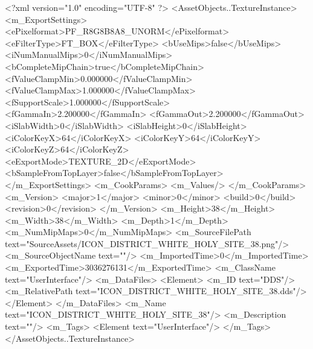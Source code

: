 <?xml version="1.0" encoding="UTF-8" ?>
<AssetObjects..TextureInstance>
	<m_ExportSettings>
		<ePixelformat>PF_R8G8B8A8_UNORM</ePixelformat>
		<eFilterType>FT_BOX</eFilterType>
		<bUseMips>false</bUseMips>
		<iNumManualMips>0</iNumManualMips>
		<bCompleteMipChain>true</bCompleteMipChain>
		<fValueClampMin>0.000000</fValueClampMin>
		<fValueClampMax>1.000000</fValueClampMax>
		<fSupportScale>1.000000</fSupportScale>
		<fGammaIn>2.200000</fGammaIn>
		<fGammaOut>2.200000</fGammaOut>
		<iSlabWidth>0</iSlabWidth>
		<iSlabHeight>0</iSlabHeight>
		<iColorKeyX>64</iColorKeyX>
		<iColorKeyY>64</iColorKeyY>
		<iColorKeyZ>64</iColorKeyZ>
		<eExportMode>TEXTURE_2D</eExportMode>
		<bSampleFromTopLayer>false</bSampleFromTopLayer>
	</m_ExportSettings>
	<m_CookParams>
		<m_Values/>
	</m_CookParams>
	<m_Version>
		<major>1</major>
		<minor>0</minor>
		<build>0</build>
		<revision>0</revision>
	</m_Version>
	<m_Height>38</m_Height>
	<m_Width>38</m_Width>
	<m_Depth>1</m_Depth>
	<m_NumMipMaps>0</m_NumMipMaps>
	<m_SourceFilePath text="SourceAssets/ICON_DISTRICT_WHITE_HOLY_SITE_38.png"/>
	<m_SourceObjectName text=""/>
	<m_ImportedTime>0</m_ImportedTime>
	<m_ExportedTime>3036276131</m_ExportedTime>
	<m_ClassName text="UserInterface"/>
	<m_DataFiles>
		<Element>
			<m_ID text="DDS"/>
			<m_RelativePath text="ICON_DISTRICT_WHITE_HOLY_SITE_38.dds"/>
		</Element>
	</m_DataFiles>
	<m_Name text="ICON_DISTRICT_WHITE_HOLY_SITE_38"/>
	<m_Description text=""/>
	<m_Tags>
		<Element text="UserInterface"/>
	</m_Tags>
</AssetObjects..TextureInstance>

